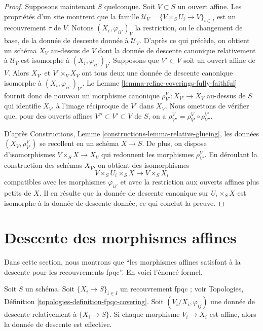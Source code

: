 \begin{proof}
\medskip\noindent
Supposons maintenant $S$ quelconque. Soit $V \subset S$ un ouvert affine.
Les propriétés d'un site montrent que la famille
$\mathcal{U}_V = \{V \times_S U_i \to V\}_{i \in I}$ est un recouvrement
$\tau$ de $V$. Notons $(X_i, \varphi_{ii'})_V$ la restriction, ou le
changement de base, de la donnée de descente donnée à $\mathcal{U}_V$. D'après
ce qui précède, on obtient un schéma $X_V$ au-dessus de $V$ dont la donnée de
descente canonique relativement à $\mathcal{U}_V$ est isomorphe à
$(X_i, \varphi_{ii'})_V$. Supposons que $V' \subset V$ soit un ouvert affine
de $V$. Alors $X_{V'}$ et $V' \times_V X_V$ ont tous deux une donnée de
descente canonique isomorphe à $(X_i, \varphi_{ii'})_{V'}$. Le
Lemme \ref{lemma-refine-coverings-fully-faithful} fournit donc de nouveau un
morphisme canonique $\rho^V_{V'} : X_{V'} \to X_V$ au-dessus de $S$ qui
identifie $X_{V'}$ à l'image réciproque de $V'$ dans $X_V$. Nous omettons de
vérifier que, pour des ouverts affines $V'' \subset V' \subset V$ de $S$, on a
$\rho^V_{V''} = \rho^V_{V'} \circ \rho^{V'}_{V''}$.

\medskip\noindent
D'après Constructions, Lemme \ref{constructions-lemma-relative-glueing}, les
données $(X_V, \rho^V_{V'})$ se recollent en un schéma $X \to S$. De plus, on
dispose d'isomorphismes $V \times_S X \to X_V$ qui redonnent les morphismes
$\rho^V_{V'}$. En déroulant la construction des schémas $X_V$, on obtient des
isomorphismes
$$
V \times_S U_i \times_S X
\longrightarrow
V \times_S X_i
$$
compatibles avec les morphismes $\varphi_{ii'}$ et avec la restriction aux
ouverts affines plus petits de $X$. Il en résulte que la donnée de descente
canonique sur $U_i \times_S X$ est isomorphe à la donnée de descente donnée,
ce qui conclut la preuve.
\end{proof}










\section{Descente des morphismes affines}
\label{section-affine}

\noindent
Dans cette section, nous montrons que
``les morphismes affines satisfont à la descente pour les recouvrements
fpqc''. En voici l'énoncé formel.

\begin{lemma}
\label{lemma-affine}
Soit $S$ un schéma. Soit $\{X_i \to S\}_{i\in I}$ un recouvrement fpqc ; voir
Topologies, Définition \ref{topologies-definition-fpqc-covering}. Soit
$(V_i/X_i, \varphi_{ij})$ une donnée de descente relativement à
$\{X_i \to S\}$. Si chaque morphisme $V_i \to X_i$ est affine, alors la
donnée de descente est effective.
\end{lemma}


